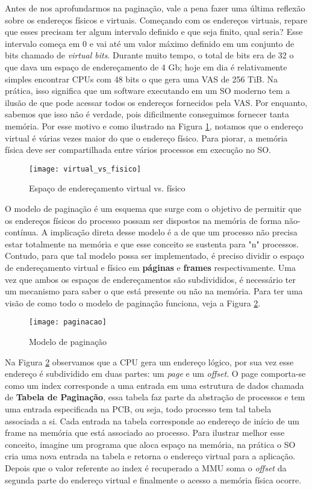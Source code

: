 Antes de nos aprofundarmos na paginação, vale a pena fazer uma última reflexão
sobre os endereços físicos e virtuais. Começando com os endereços virtuais,
repare que esses precisam ter algum intervalo definido e que seja finito, qual
seria? Esse intervalo começa em 0 e vai até um valor máximo definido em um
conjunto de bits chamado de \textit{virtual bits}. Durante muito tempo, o total
de bits era de 32 o que dava um espaço de endereçamento de 4 Gb; hoje em dia é
relativamente simples encontrar CPUs com 48 bits o que gera uma VAS de 256 TiB.
Na prática, isso significa que um software executando em um SO moderno tem a
ilusão de que pode acessar todos os endereços fornecidos pela VAS. Por
enquanto, sabemos que isso não é verdade, pois dificilmente conseguimos
fornecer tanta memória. Por esse motivo e como ilustrado na Figura
\ref{fig:vas_pas}, notamos que o endereço virtual é várias vezes maior do que o
endereço físico. Para piorar, a memória física deve ser compartilhada entre
vários processos em execução no SO.

\begin{figure}[!h]
  \centering
  \texttt{[image: virtual\_vs\_fisico]} 
  \caption{Espaço de endereçamento virtual vs. físico}
  \label{fig:vas_pas}
\end{figure}

O modelo de paginação é um esquema que surge com o objetivo de permitir que os
endereços físicos do processo possam ser dispostos na memória de forma
não-contínua. A implicação direta desse modelo é a de que um processo não
precisa estar totalmente na memória e que esse conceito se sustenta para "n"
processos. Contudo, para que tal modelo possa ser implementado, é preciso
dividir o espaço de endereçamento virtual e físico em \textbf{páginas} e
\textbf{frames} respectivamente. Uma vez que ambos os espaços de endereçamentos
são subdivididos, é necessário ter um mecanismo para saber o que está presente
ou não na memória. Para ter uma visão de como todo o modelo de paginação
funciona, veja a Figura \ref{fig:paginacao}.

\begin{figure}[!h]
  \centering
  \texttt{[image: paginacao]} 
  \caption{Modelo de paginação}
  \label{fig:paginacao}
\end{figure}

Na Figura \ref{fig:paginacao} observamos que a CPU gera um endereço lógico, por
sua vez esse endereço é subdividido em duas partes: um \textit{page} e um
\textit{offset}. O page comporta-se como um index corresponde a uma entrada em
uma estrutura de dados chamada de \textbf{Tabela de Paginação}, essa tabela faz
parte da abstração de processos e tem uma entrada especificada na PCB, ou seja,
todo processo tem tal tabela associada a si. Cada entrada na tabela corresponde
ao endereço de início de um frame na memória que está associado ao processo.
Para ilustrar melhor esse conceito, imagine um programa que aloca espaço na
memória, na prática o SO cria uma nova entrada na tabela e retorna o endereço
virtual para a aplicação.  Depois que o valor referente ao index é recuperado a
MMU soma o \textit{offset} da segunda parte do endereço virtual e finalmente o
acesso a memória física ocorre.

